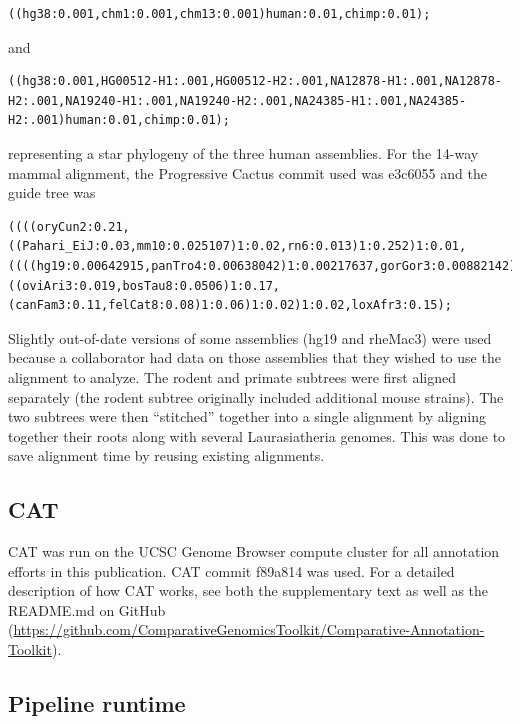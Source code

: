 \documentclass[fleqn,10pt]{wlscirep}
\begin{document}
\begin{lstlisting}
((hg38:0.001,chm1:0.001,chm13:0.001)human:0.01,chimp:0.01);
\end{lstlisting}

and

\begin{lstlisting}
((hg38:0.001,HG00512-H1:.001,HG00512-H2:.001,NA12878-H1:.001,NA12878-H2:.001,NA19240-H1:.001,NA19240-H2:.001,NA24385-H1:.001,NA24385-H2:.001)human:0.01,chimp:0.01);
\end{lstlisting}
  
representing a star phylogeny of the three human assemblies. For the 14-way mammal alignment, the Progressive Cactus commit used was e3c6055 and the guide tree was 
  
\begin{lstlisting}
((((oryCun2:0.21,((Pahari_EiJ:0.03,mm10:0.025107)1:0.02,rn6:0.013)1:0.252)1:0.01,((((hg19:0.00642915,panTro4:0.00638042)1:0.00217637,gorGor3:0.00882142)1:0.00935116,ponAbe2:0.0185056)1:0.00440069,rheMac3:0.007)1:0.1)1:0.02,((oviAri3:0.019,bosTau8:0.0506)1:0.17,(canFam3:0.11,felCat8:0.08)1:0.06)1:0.02)1:0.02,loxAfr3:0.15);
\end{lstlisting}

Slightly out-of-date versions of some assemblies (hg19 and rheMac3) were used because a collaborator had data on those assemblies that they wished to use the alignment to analyze. The rodent and primate subtrees were first aligned separately (the rodent subtree originally included additional mouse strains)\cite{thybert2018repeat,lilue2018multiple}. The two subtrees were then “stitched” together into a single alignment by aligning together their roots along with several Laurasiatheria genomes. This was done to save alignment time by reusing existing alignments.

\subsection*{CAT}

CAT was run on the UCSC Genome Browser compute cluster for all annotation efforts in this publication. CAT commit f89a814 was used. For a detailed description of how CAT works, see both the supplementary text as well as the README.md on GitHub (\url{https://github.com/ComparativeGenomicsToolkit/Comparative-Annotation-Toolkit}). 

\subsection*{Pipeline runtime}
\end{document}
